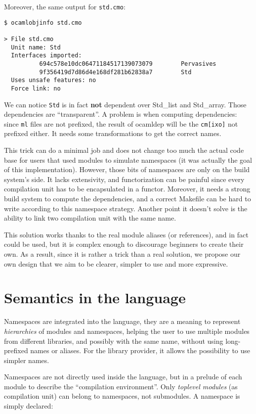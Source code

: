 \documentclass[11pt,a4paper]{article}
\begin{document}
Moreover, the same output for \texttt{std.cmo}:

\begin{verbatim}
$ ocamlobjinfo std.cmo

> File std.cmo
  Unit name: Std
  Interfaces imported:
          694c578e10dc06471184517139073079        Pervasives
          9f356419d7d86d4e168df281b62838a7        Std
  Uses unsafe features: no
  Force link: no
\end{verbatim}

We can notice \texttt{Std} is in fact \textbf{not} dependent over Std\_list and
Std\_array. Those dependencies are ``transparent''. A problem is when computing
dependencies: since \texttt{ml} files are not prefixed, the result of ocamldep will
be the \texttt{cm[ixo]} not prefixed either. It needs some transformations to get
the correct names.

This trick can do a minimal job and does not change too much the actual code
base for users that used modules to simulate namespaces (it was actually the
goal of this implementation). However, those bits of namespaces are only on the
build system's side. It lacks extensivity, and functorization can be painful
since every compilation unit has to be encapsulated in a functor. Moreover, it
needs a strong build system to compute the dependencies, and a correct Makefile
can be hard to write according to this namespace strategy. Another point it
doesn't solve is the ability to link two compilation unit with the same name.

This solution works thanks to the real module aliases (or references), and in
fact could be used, but it is complex enough to discourage beginners to create
their own. As a result, since it is rather a trick than a real solution, we
propose our own design that we aim to be clearer, simpler to use and more
expressive.

\section{Semantics in the language}

Namespaces are integrated into the language, they are a meaning to represent
\emph{hierarchies} of modules and namespaces, helping the user to use multiple
modules from different libraries, and possibly with the same name, without using
long-prefixed names or aliases. For the library provider, it allows the
possibility to use simpler names.

Namespaces are not directly used inside the language, but in a prelude of each
module to describe the ``compilation environment''. Only \emph{toplevel modules}
(as compilation unit) can belong to namespaces, not submodules. A namespace is
simply declared: 
\end{document}

